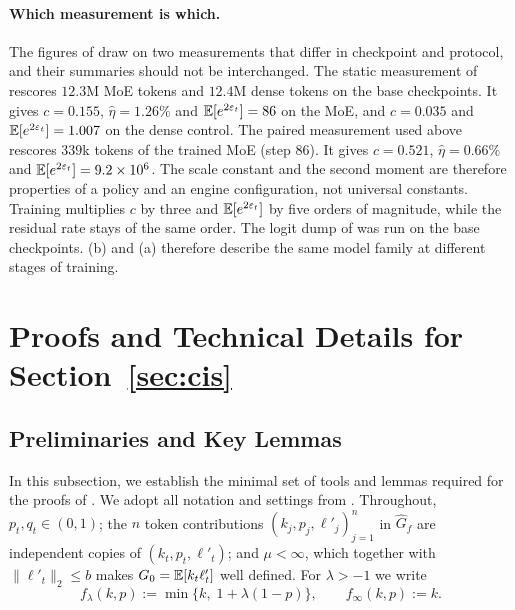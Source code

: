 \paragraph{Which measurement is which.}
The figures of  draw on two measurements that differ in
checkpoint and protocol, and their summaries should not be interchanged. The
static measurement of  rescores $12.3$M MoE tokens and
$12.4$M dense tokens on the base checkpoints. It gives $c=0.155$,
$\hat\eta=1.26\%$ and $\mathbb{E}[e^{2\varepsilon_t}]=86$ on the MoE, and
$c=0.035$ and $\mathbb{E}[e^{2\varepsilon_t}]=1.007$ on the dense control. The paired
measurement used above rescores $339$k tokens of the trained MoE (step 86). It
gives $c=0.521$, $\hat\eta=0.66\%$ and
$\mathbb{E}[e^{2\varepsilon_t}]=9.2\times10^6$. The scale constant and the second
moment are therefore properties of a policy and an engine configuration, not
universal constants. Training multiplies $c$ by three and
$\mathbb{E}[e^{2\varepsilon_t}]$ by five orders of magnitude, while the residual rate
stays of the same order. The logit dump of  was run on the
base checkpoints. (b) and (a) therefore
describe the same model family at different stages of training.
\section{Proofs and Technical Details for Section~\ref{sec:cis}}
\label{app:proofs}

\subsection{Preliminaries and Key Lemmas}
\label{app:lemmas}

In this subsection, we establish the minimal set of tools and lemmas required
for the proofs of . We adopt
all notation and settings from . Throughout, $p_t,q_t\in(0,1)$;
the $n$ token contributions $(k_j,p_j,\ell'_j)_{j=1}^n$ in $\widehat G_f$ are
independent copies of $(k_t,p_t,\ell'_t)$; and $\mu<\infty$, which together
with $\|\ell'_t\|_2\le b$ makes $G_0=\mathbb{E}[k_t\ell'_t]$ well defined. For
$\lambda>-1$ we write
\begin{equation}
f_\lambda(k,p):=\min\big\{k,\;1+\lambda(1-p)\big\},
\qquad f_\infty(k,p):=k .
\label{eq:f_lambda_def}
\end{equation}

